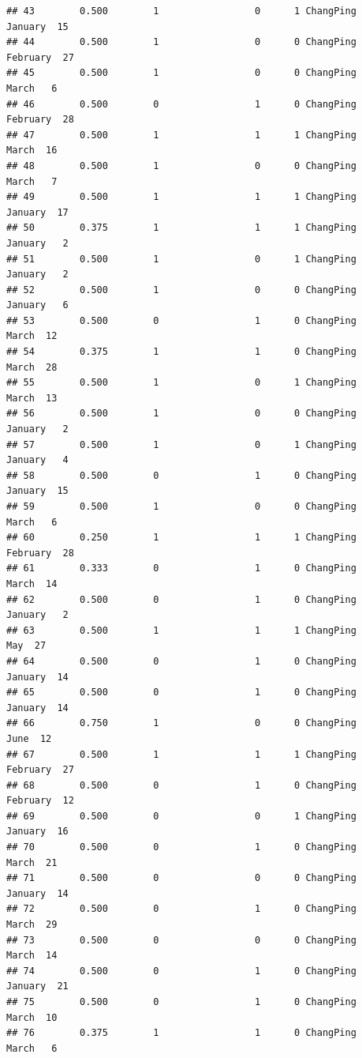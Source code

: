 \documentclass[
]{article}
\begin{document}
\begin{verbatim}
## 43        0.500        1                 0      1 ChangPing   January  15
## 44        0.500        1                 0      0 ChangPing  February  27
## 45        0.500        1                 0      0 ChangPing     March   6
## 46        0.500        0                 1      0 ChangPing  February  28
## 47        0.500        1                 1      1 ChangPing     March  16
## 48        0.500        1                 0      0 ChangPing     March   7
## 49        0.500        1                 1      1 ChangPing   January  17
## 50        0.375        1                 1      1 ChangPing   January   2
## 51        0.500        1                 0      1 ChangPing   January   2
## 52        0.500        1                 0      0 ChangPing   January   6
## 53        0.500        0                 1      0 ChangPing     March  12
## 54        0.375        1                 1      0 ChangPing     March  28
## 55        0.500        1                 0      1 ChangPing     March  13
## 56        0.500        1                 0      0 ChangPing   January   2
## 57        0.500        1                 0      1 ChangPing   January   4
## 58        0.500        0                 1      0 ChangPing   January  15
## 59        0.500        1                 0      0 ChangPing     March   6
## 60        0.250        1                 1      1 ChangPing  February  28
## 61        0.333        0                 1      0 ChangPing     March  14
## 62        0.500        0                 1      0 ChangPing   January   2
## 63        0.500        1                 1      1 ChangPing       May  27
## 64        0.500        0                 1      0 ChangPing   January  14
## 65        0.500        0                 1      0 ChangPing   January  14
## 66        0.750        1                 0      0 ChangPing      June  12
## 67        0.500        1                 1      1 ChangPing  February  27
## 68        0.500        0                 1      0 ChangPing  February  12
## 69        0.500        0                 0      1 ChangPing   January  16
## 70        0.500        0                 1      0 ChangPing     March  21
## 71        0.500        0                 0      0 ChangPing   January  14
## 72        0.500        0                 1      0 ChangPing     March  29
## 73        0.500        0                 0      0 ChangPing     March  14
## 74        0.500        0                 1      0 ChangPing   January  21
## 75        0.500        0                 1      0 ChangPing     March  10
## 76        0.375        1                 1      0 ChangPing     March   6

\end{verbatim}
\end{document}
